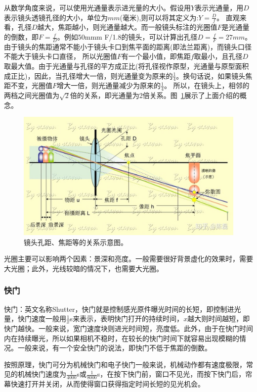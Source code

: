\documentclass{ctexart}
\begin{document}
从数学角度来说，可以使用光通量表示进光量的大小。假设用$Y$表示光通量，用$D$表示镜头透镜孔径的大小，单位为$mm$(毫米),则可以将其定义为:$Y=\frac{D}{f}$。
直观来看，孔径$D$越大，焦距越小，则光通量越大。而一般镜头标注的光圈值$F$是光通量的倒数，即$F=\frac{f}{D}$。例如50mmm F/1.8的镜头，可以计算出孔径$D=\frac{f}{F}=27mm$。
由于镜头的焦距通常不能小于镜头卡口到焦平面的距离(即法兰距离)，而镜头口径不能大于镜头卡口直径， 所以光圈值$F$有一个最小值，即焦距$f$取最小，且孔径$D$取最大值。由于光通量与孔径的平方成正比(将孔径视作原型，光通量与原型面积成正比)，因此，当孔径增大一倍，则光通量变为原来的$\frac{1}{4}$。换句话说，如果镜头焦距不变，光圈值$F$增大一倍，则光通量减少为原来的$\frac{1}{4}$。
所以，在镜头上，相邻的两档之间光圈值为$\sqrt{2}$倍的关系，即光通量为2倍关系。图~\ref{fig_aperture_math}展示了上面介绍的概念。
\begin{figure}[h!]
    \centering
    \includegraphics[width=.8\linewidth]{imgs/aperture_math.jpg}
    \caption{镜头孔距、焦距等的关系示意图。}
    \label{fig_aperture_math}
\end{figure}

光圈主要可以影响两个因素：景深和亮度。一般需要很好背景虚化的效果时，需要大光圈；此外，光线较暗的情况下，也需要大光圈。

\subsubsection{快门}
快门：英文名称Shutter，快门就是控制感光原件曝光时间的长短，即控制进光量，快门速度一般用$\frac{1}{x}$s来表示，表明快门打开的持续时间，$x$越大则时间越短，即快门越快。一般来说，宽门速度块则进光时间短，亮度低。此外，由于在快门时间内在持续曝光，所以如果相机不稳时，在较长的快门时间下就容易出现模糊的情况。一般来说，有一个安全快门的说法，即快门不低于焦距的倒数。

按照原理，快门可分为机械快门和电子快门一般来说，机械动作都有速度极限，常见的机械快门速度为$\frac{1}{4000}$s或$\frac{1}{8000}$s，在按下快门前，窗口不见光，而按下快门后，帘幕快速打开并关闭，从而使得窗口获得指定时间长短的见光机会。
\end{document}
